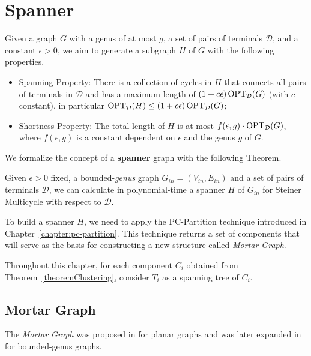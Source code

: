 \chapter{Spanner}
\label{chapter:spanner}

Given a graph \(G\) with a genus of at most \(g\), a set of pairs of terminals \(\mathcal{D}\), and a constant \(\epsilon > 0\), we aim to generate a subgraph \(H\) of \(G\) with the following properties. 

\begin{itemize}
    \item Spanning Property: There is a collection of cycles in \(H\) that connects all pairs of terminals in \(\mathcal{D}\) and has a maximum length of \((1 + c \epsilon) \operatorname{\textrm{OPT}}_{\mathcal{D}}(G)\) (with \(c\) constant), in particular \(\operatorname{\textrm{OPT}}_{\mathcal{D}}(H) \leq (1 + c \epsilon) \operatorname{\textrm{OPT}}_{\mathcal{D}}(G)\);
    \item Shortness Property: The total length of \(H\) is at most \(f(\epsilon, g) \cdot \operatorname{\textrm{OPT}}_{\mathcal{D}}(G)\), where \(f(\epsilon, g)\) is a constant dependent on \(\epsilon\) and the genus \(g\) of \(G\).
\end{itemize}

We formalize the concept of a \textbf{spanner} graph with the following Theorem.

\begin{theorem}\label{theorem:spanner}
Given \(\epsilon > 0\) fixed, a bounded-\textit{genus} graph \(G_{in} = (V_{in}, E_{in})\) and a set of pairs of terminals \(\mathcal{D}\), we can calculate in polynomial-time a spanner \(H\) of \(G_{in}\) for Steiner Multicycle with respect to \(\mathcal{D}\).
\end{theorem}

To build a spanner \(H\), we need to apply the PC-Partition technique introduced in Chapter~\ref{chapter:pc-partition}. This technique returns a set of components that will serve as the basis for constructing a new structure called \textit{Mortar Graph}.

Throughout this chapter, for each component \(C_i\) obtained from Theorem~\ref{theoremClustering}, consider \(T_i\) as a spanning tree of \(C_i\).

\section{Mortar Graph}

The \textit{Mortar Graph} was proposed in \cite{Borradaile2009b} for planar graphs and was later expanded in \cite{Borradaile2012} for bounded-genus graphs.

